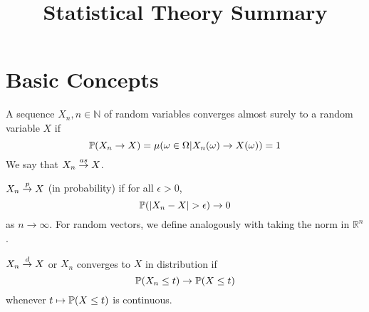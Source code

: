 

\title{Statistical Theory Summary}



\maketitle

\section{Basic Concepts}

\begin{defn}
  A sequence $X_{n}, n \in \mathbb{N}$ of random variables converges
  almost surely to a random variable $X$ if
  \begin{equation}
    \label{eq:4}
    \Prob{X_{n} \rightarrow X} = \mu(\omega \in \Omega | X_{n}(\omega)
    \rightarrow X(\omega)) = 1
  \end{equation}
  We say that $X_{n} \overset{as}{\rightarrow} X$.
\end{defn}

\begin{defn}
  $X_{n} \overset{p}{\rightarrow} X$ (in probability) if for all $\epsilon > 0$,
  \begin{equation}
    \label{eq:5}
    \Prob{|X_{n} - X| > \epsilon} \rightarrow 0
  \end{equation} as $n \rightarrow \infty$.
  For random vectors, we define analogously with taking the norm in
  $\mathbb{R}^{n}$.
\end{defn}

\begin{defn}
  $X_{n} \overset{d}{\rightarrow} X$ or $X_{n}$ converges to $X$ in distribution if
  \begin{equation}
    \label{eq:6}
    \Prob{X_{n} \leq t} \rightarrow \Prob{X \leq t}
  \end{equation} whenever $t \mapsto \Prob{X \leq t}$ is continuous.
\end{defn}

